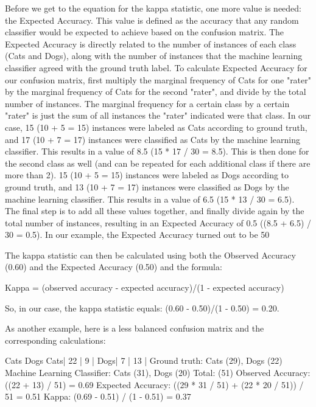 \documentclass[caret-main.tex]{subfiles}
\begin{document}
Before we get to the equation for the kappa statistic, one more value is needed: the Expected Accuracy. This value is defined as the accuracy that any random classifier would be expected to achieve based on the confusion matrix. The Expected Accuracy is directly related to the number of instances of each class (Cats and Dogs), along with the number of instances that the machine learning classifier agreed with the ground truth label. To calculate Expected Accuracy for our confusion matrix, first multiply the marginal frequency of Cats for one "rater" by the marginal frequency of Cats for the second "rater", and divide by the total number of instances. The marginal frequency for a certain class by a certain "rater" is just the sum of all instances the "rater" indicated were that class. In our case, 15 (10 + 5 = 15) instances were labeled as Cats according to ground truth, and 17 (10 + 7 = 17) instances were classified as Cats by the machine learning classifier. This results in a value of 8.5 (15 * 17 / 30 = 8.5). This is then done for the second class as well (and can be repeated for each additional class if there are more than 2). 15 (10 + 5 = 15) instances were labeled as Dogs according to ground truth, and 13 (10 + 7 = 17) instances were classified as Dogs by the machine learning classifier. This results in a value of 6.5 (15 * 13 / 30 = 6.5). The final step is to add all these values together, and finally divide again by the total number of instances, resulting in an Expected Accuracy of 0.5 ((8.5 + 6.5) / 30 = 0.5). In our example, the Expected Accuracy turned out to be 50%

The kappa statistic can then be calculated using both the Observed Accuracy (0.60) and the Expected Accuracy (0.50) and the formula:

Kappa = (observed accuracy - expected accuracy)/(1 - expected accuracy)


So, in our case, the kappa statistic equals: (0.60 - 0.50)/(1 - 0.50) = 0.20.

As another example, here is a less balanced confusion matrix and the corresponding calculations:

     Cats Dogs
Cats| 22 | 9  |
Dogs| 7  | 13 |
Ground truth: Cats (29), Dogs (22) 
Machine Learning Classifier: Cats (31), Dogs (20) 
Total: (51) 
Observed Accuracy: ((22 + 13) / 51) = 0.69 
Expected Accuracy: ((29 * 31 / 51) + (22 * 20 / 51)) / 51 = 0.51 
Kappa: (0.69 - 0.51) / (1 - 0.51) = 0.37
\end{document}
